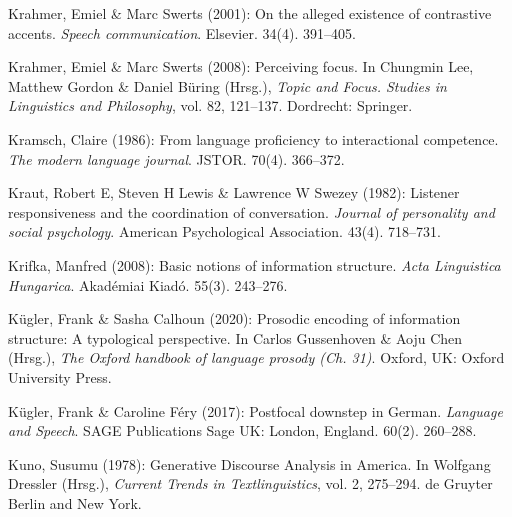 \begin{styleBibliography}
Krahmer, Emiel \& Marc Swerts (2001): On the alleged existence of contrastive accents. \textit{Speech communication}. Elsevier. 34(4). 391–405.
\end{styleBibliography}

\begin{styleBibliography}
Krahmer, Emiel \& Marc Swerts (2008): Perceiving focus. In Chungmin Lee, Matthew Gordon \& Daniel Büring (Hrsg.), \textit{Topic and Focus. Studies in Linguistics and Philosophy}, vol. 82, 121–137. Dordrecht: Springer.
\end{styleBibliography}

\begin{styleBibliography}
Kramsch, Claire (1986): From language proficiency to interactional competence. \textit{The modern language journal}. JSTOR. 70(4). 366–372.
\end{styleBibliography}

\begin{styleBibliography}
Kraut, Robert E, Steven H Lewis \& Lawrence W Swezey (1982): Listener responsiveness and the coordination of conversation. \textit{Journal of personality and social psychology}. American Psychological Association. 43(4). 718–731.
\end{styleBibliography}

\begin{styleBibliography}
Krifka, Manfred (2008): Basic notions of information structure. \textit{Acta Linguistica Hungarica}. Akadémiai Kiadó. 55(3). 243–276.
\end{styleBibliography}

\begin{styleBibliography}
Kügler, Frank \& Sasha Calhoun (2020): Prosodic encoding of information structure: A typological perspective. In Carlos Gussenhoven \& Aoju Chen (Hrsg.), \textit{The Oxford handbook of language prosody (Ch. 31)}. Oxford, UK: Oxford University Press.
\end{styleBibliography}

\begin{styleBibliography}
Kügler, Frank \& Caroline Féry (2017): Postfocal downstep in German. \textit{Language and Speech}. SAGE Publications Sage UK: London, England. 60(2). 260–288.
\end{styleBibliography}

\begin{styleBibliography}
Kuno, Susumu (1978): Generative Discourse Analysis in America. In Wolfgang Dressler (Hrsg.), \textit{Current Trends in Textlinguistics}, vol. 2, 275–294. de Gruyter Berlin and New York.
\end{styleBibliography}

